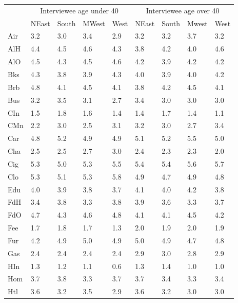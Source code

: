 \documentclass[12pt]{article}
\begin{document}
\begin{table}[!ht]
    \centering
    {\footnotesize
    \begin{tabular}{lllllllll}
        \hline\hline
        & \multicolumn{4}{c}{Interviewee age under 40} & \multicolumn{4}{c}{Interviewee age over 40}\\
            & NEast & South & MWest & West  & NEast & South & Mwest & West \\
        \hline
        Air & 3.2 & 3.0 & 3.4 & 2.9 & 3.2 & 3.2 & 3.7 & 3.2\\
        AlH & 4.4 & 4.5 & 4.6 & 4.3 & 3.8 & 4.2 & 4.0 & 4.6\\
        AlO & 4.5 & 4.3 & 4.5 & 4.6 & 4.2 & 3.9 & 4.2 & 4.2\\
        Bks & 4.3 & 3.8 & 3.9 & 4.3 & 4.0 & 3.9 & 4.0 & 4.2\\
        Brb & 4.8 & 4.1 & 4.5 & 4.1 & 3.8 & 4.2 & 4.5 & 4.1\\
        Bus & 3.2 & 3.5 & 3.1 & 2.7 & 3.4 & 3.0 & 3.0 & 3.0\\
        CIn & 1.5 & 1.8 & 1.6 & 1.4 & 1.4 & 1.7 & 1.4 & 1.1\\
        CMn & 2.2 & 3.0 & 2.5 & 3.1 & 3.2 & 3.0 & 2.7 & 3.4\\
        Car & 4.8 & 5.2 & 4.9 & 4.9 & 5.1 & 5.2 & 5.5 & 5.0\\
        Cha & 2.5 & 2.5 & 2.7 & 3.0 & 2.4 & 2.3 & 2.3 & 2.0\\
        Cig & 5.3 & 5.0 & 5.3 & 5.5 & 5.4 & 5.4 & 5.6 & 5.7\\
        Clo & 5.3 & 5.1 & 5.3 & 5.8 & 4.9 & 4.7 & 4.9 & 4.8\\
        Edu & 4.0 & 3.9 & 3.8 & 3.7 & 4.1 & 4.0 & 4.2 & 3.8\\
        FdH & 3.4 & 3.8 & 3.3 & 3.8 & 3.9 & 3.6 & 3.3 & 3.7\\
        FdO & 4.7 & 4.3 & 4.6 & 4.8 & 4.1 & 4.1 & 4.5 & 4.2\\
        Fee & 1.7 & 1.8 & 1.7 & 1.3 & 2.0 & 1.9 & 2.0 & 1.9\\
        Fur & 4.2 & 4.9 & 5.0 & 4.9 & 5.0 & 4.9 & 4.7 & 4.8\\
        Gas & 2.4 & 2.4 & 2.4 & 2.4 & 2.9 & 3.0 & 2.8 & 2.9\\
        HIn & 1.3 & 1.2 & 1.1 & 0.6 & 1.3 & 1.4 & 1.0 & 1.0\\
        Hom & 3.7 & 3.8 & 3.3 & 3.7 & 3.7 & 3.4 & 3.3 & 3.4\\
        Htl & 3.6 & 3.2 & 3.5 & 2.9 & 3.6 & 3.2 & 3.0 & 3.0\\

\end{tabular}}
\end{table}
\end{document}
